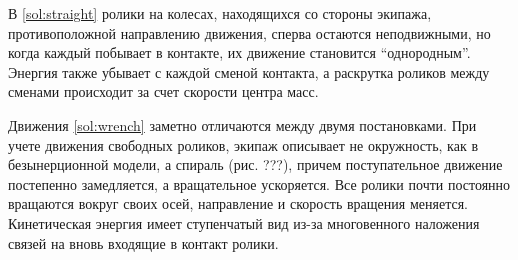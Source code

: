 В \ref{sol:straight} ролики на колесах, находящихся со стороны экипажа, противоположной направлению движения, сперва остаются неподвижными, но когда каждый побывает в контакте, их движение становится ``однородным''. Энергия также убывает с каждой сменой контакта, а раскрутка роликов между сменами происходит за счет скорости центра масс.

Движения \ref{sol:wrench} заметно отличаются между двумя постановками. При учете движения свободных роликов, экипаж описывает не окружность, как в безынерционной модели, а спираль (рис. ???), причем поступательное движение постепенно замедляется, а вращательное ускоряется. Все ролики почти постоянно вращаются вокруг своих осей, направление и скорость вращения меняется. Кинетическая энергия имеет ступенчатый вид из-за многовенного наложения связей на вновь входящие в контакт ролики.


